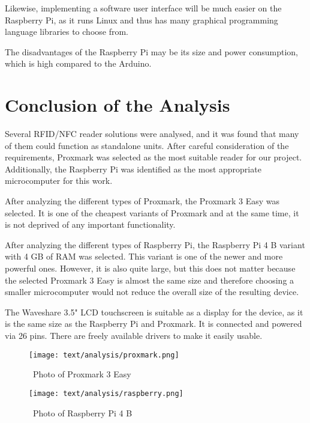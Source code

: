 Likewise, implementing a software user interface will be much easier on the Raspberry Pi, as it runs Linux and thus has many graphical programming language libraries to choose from.  

The disadvantages of the Raspberry Pi may be its size and power consumption, which is high compared to the Arduino. 


\section{Conclusion of the Analysis}

Several RFID/NFC reader solutions were analysed, and it was found that many of them could function as standalone units. After careful consideration of the requirements, Proxmark was selected as the most suitable reader for our project. Additionally, the Raspberry Pi was identified as the most appropriate microcomputer for this work.

After analyzing the different types of Proxmark, the Proxmark 3 Easy was selected. It is one of the cheapest variants of Proxmark and at the same time, it is not deprived of any important functionality.

After analyzing the different types of Raspberry Pi, the Raspberry Pi 4 B variant with 4 GB of RAM was selected. This variant is one of the newer and more powerful ones. However, it is also quite large, but this does not matter because the selected Proxmark 3 Easy is almost the same size and therefore choosing a smaller microcomputer would not reduce the overall size of the resulting device.

The Waveshare 3.5" LCD touchscreen is suitable as a display for the device, as it is the same size as the Raspberry Pi and Proxmark. It is connected and powered via 26 pins. There are freely available drivers to make it easily usable.~\cite{waveshare35inch}

\begin{figure}[h]
    \centering
    \begin{minipage}[b]{0.45\textwidth}
        \centering
        \texttt{[image: text/analysis/proxmark.png]}
        \caption{~Photo of Proxmark 3 Easy}
        \label{fig:sub1}
    \end{minipage}
    \hfill
    \begin{minipage}[b]{0.45\textwidth}
        \centering
        \texttt{[image: text/analysis/raspberry.png]}
        \caption{~Photo of Raspberry Pi 4 B}
        \label{fig:sub2}
    \end{minipage}
    \label{fig:main}
\end{figure}